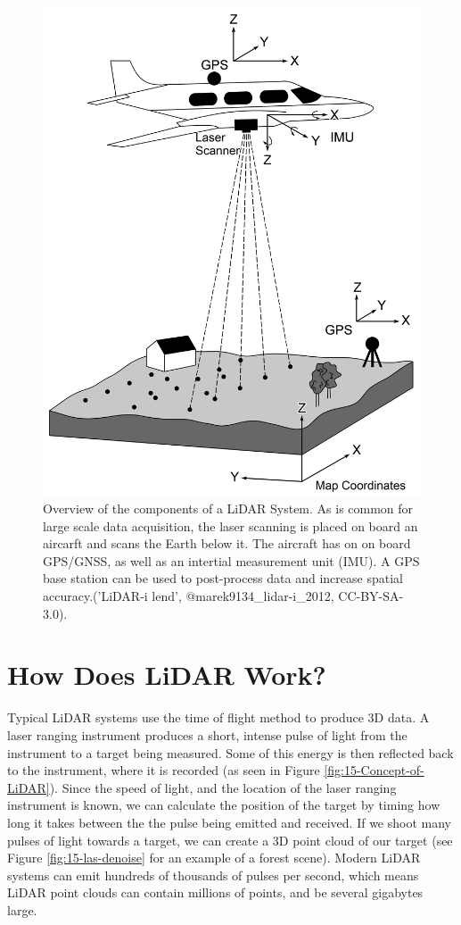 \documentclass[
]{book}
\begin{document}
\begin{figure}
\includegraphics[width=0.6\linewidth]{images/15-LiDAR-System} \caption{Overview of the components of a LiDAR System. As is common for large scale data acquisition, the laser scanning is placed on board an aircarft and scans the Earth below it. The aircraft has on on board GPS/GNSS, as well as an intertial measurement unit (IMU). A GPS base station can be used to post-process data and increase spatial accuracy.('LiDAR-i lend', @marek9134_lidar-i_2012, CC-BY-SA-3.0).}\label{fig:15-LiDAR-System}
\end{figure}

\hypertarget{how-does-lidar-work}{%
\section{How Does LiDAR Work?}\label{how-does-lidar-work}}

Typical LiDAR systems use the time of flight method to produce 3D data. A laser ranging instrument produces a short, intense pulse of light from the instrument to a target being measured. Some of this energy is then reflected back to the instrument, where it is recorded (as seen in Figure \ref{fig:15-Concept-of-LiDAR}). Since the speed of light, and the location of the laser ranging instrument is known, we can calculate the position of the target by timing how long it takes between the the pulse being emitted and received. If we shoot many pulses of light towards a target, we can create a 3D point cloud of our target (see Figure \ref{fig:15-las-denoise} for an example of a forest scene). Modern LiDAR systems can emit hundreds of thousands of pulses per second, which means LiDAR point clouds can contain millions of points, and be several gigabytes large.
\end{document}

